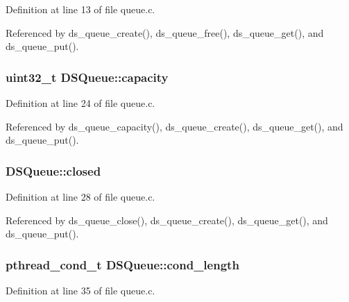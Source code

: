Definition at line 13 of file queue.\+c.



Referenced by ds\+\_\+queue\+\_\+create(), ds\+\_\+queue\+\_\+free(), ds\+\_\+queue\+\_\+get(), and ds\+\_\+queue\+\_\+put().

\subsubsection[{\texorpdfstring{capacity}{capacity}}]{\setlength{\rightskip}{0pt plus 5cm}uint32\+\_\+t D\+S\+Queue\+::capacity}\hypertarget{structDSQueue_ab52ffad4efeddd0e4ce1bc11e0d24fa9}{}\label{structDSQueue_ab52ffad4efeddd0e4ce1bc11e0d24fa9}


Definition at line 24 of file queue.\+c.



Referenced by ds\+\_\+queue\+\_\+capacity(), ds\+\_\+queue\+\_\+create(), ds\+\_\+queue\+\_\+get(), and ds\+\_\+queue\+\_\+put().

\subsubsection[{\texorpdfstring{closed}{closed}}]{ D\+S\+Queue\+::closed}\hypertarget{structDSQueue_a6343bf4d2ad2ba6baa72f87cd21b7a1c}{}\label{structDSQueue_a6343bf4d2ad2ba6baa72f87cd21b7a1c}


Definition at line 28 of file queue.\+c.



Referenced by ds\+\_\+queue\+\_\+close(), ds\+\_\+queue\+\_\+create(), ds\+\_\+queue\+\_\+get(), and ds\+\_\+queue\+\_\+put().

\subsubsection[{\texorpdfstring{cond\+\_\+length}{cond_length}}]{\setlength{\rightskip}{0pt plus 5cm}pthread\+\_\+cond\+\_\+t D\+S\+Queue\+::cond\+\_\+length}\hypertarget{structDSQueue_a086bc58081ff434dc5b0d46d98814599}{}\label{structDSQueue_a086bc58081ff434dc5b0d46d98814599}


Definition at line 35 of file queue.\+c.



